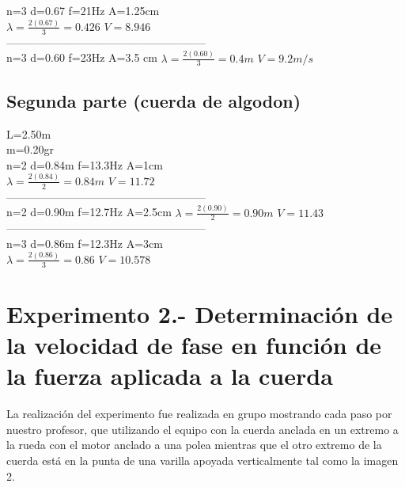 \documentclass[10pt]{article}
\begin{document}
\begin{multicols}{2}
n=3 d=0.67 f=21Hz A=1.25cm\\
$\lambda=\frac{2(0.67)}{3}=0.426$ $V=8.946$\\
------------------------------------------------------\\
n=3 d=0.60 f=23Hz A=3.5 cm
$\lambda=\frac{2(0.60)}{3}=0.4m $ $V=9.2 m/s$\\

\subsection{Segunda parte (cuerda de algodon)}
L=2.50m\\
m=0.20gr\\
n=2 d=0.84m f=13.3Hz A=1cm\\
$\lambda=\frac{2(0.84)}{2}=0.84m$ $V=11.72 $ \\
------------------------------------------------------\\
n=2 d=0.90m f=12.7Hz A=2.5cm
$\lambda=\frac{2(0.90)}{2}=0.90m$ $V=11.43 $\\
------------------------------------------------------   \\
n=3 d=0.86m f=12.3Hz A=3cm\\
$\lambda=\frac{2(0.86)}{3}=0.86$ $V=10.578 $\\



\section{Experimento 2.- Determinación de la velocidad de fase en función de la fuerza aplicada a la cuerda}
La realización del experimento fue realizada en grupo mostrando cada paso por nuestro profesor, que utilizando el equipo con la cuerda anclada en un extremo a la rueda con el motor anclado a una polea mientras que el otro extremo de la cuerda está en la punta de una varilla apoyada verticalmente tal como la imagen 2. 
 

\end{multicols}
\end{document}
